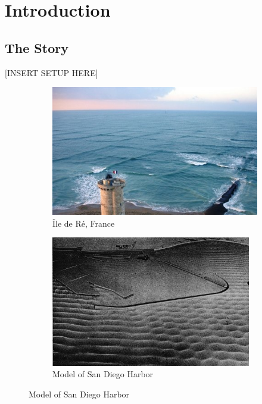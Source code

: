 \chapter{Introduction} \label{ch:Introduction}



\section{The Story} \label{sec:the-story}

[INSERT SETUP HERE]

\begin{figure}
  \centering
  \begin{subfigure}[b]{0.5\textwidth}
    \includegraphics[width=\textwidth]{images/livekp.jpg}
    \caption{\^{I}le de R\'{e}, France}
    \label{fig:ile-de-re}
  \end{subfigure}

  \begin{subfigure}[b]{0.5\textwidth}
    \centering
    \includegraphics[width=0.96\textwidth]{images/sd-harbor-model.jpg}
    \caption{Model of San Diego Harbor}
    \label{fig:san-diego-harbor}
  \end{subfigure}
  \label{fig:real-life}
\end{figure}

